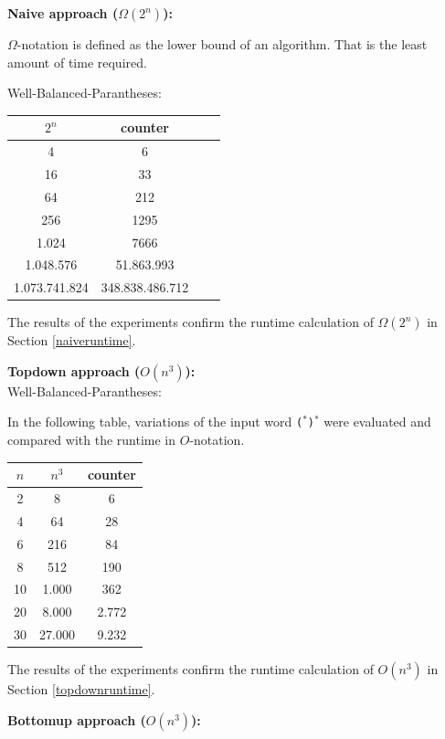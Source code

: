 \documentclass[a4paper, 11pt]{article}
\begin{document}
\textbf{Naive approach ($\Omega(2^n)$):}

$\Omega$-notation is defined as the lower bound of an algorithm. That is the least amount of time required. \cite{GFG}

Well-Balanced-Parantheses: 
\begin{center}
\begin{tabular}{|c|c|c|c|}
\hline
$2^n$ & counter \\
\hline
4 &  6\\
16 &  33\\
64 &  212\\
256 &  1295\\
1.024 &  7666 \\
1.048.576 &  51.863.993\\
1.073.741.824 &  348.838.486.712\\
\hline
\end{tabular}
\end{center}


The results of the experiments confirm the runtime calculation of $\Omega(2^n)$ in Section \ref{naiveruntime}. 







\textbf{Topdown approach ($O(n^3)$):} \\
Well-Balanced-Parantheses: 

In the following table, variations of the input word \texttt{($^*$)$^*$} were evaluated and compared with the runtime in $O$-notation.

\begin{center}
\begin{tabular}{|c|c|c|}
\hline
$n$ & $n^3$ & counter \\
\hline
2& 8 & 6\\
4& 64 & 28\\
6& 216 & 84\\
8& 512 & 190\\
10& 1.000 & 362 \\
20& 8.000 & 2.772\\
30& 27.000 & 9.232\\
\hline
\end{tabular}
\end{center}

The results of the experiments confirm the runtime calculation of $O(n^3)$ in Section \ref{topdownruntime}.



\textbf{Bottomup approach ($O(n^3)$):} \\
\end{document}
